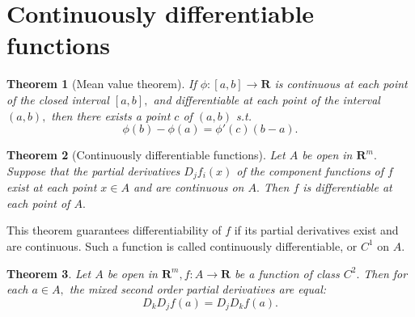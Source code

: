 \documentclass[17pt]{extarticle}
\theoremstyle{plain}
\newtheorem{theorem}{Theorem}
\theoremstyle{definition}
\theoremstyle{remark}
\newcommand{\bR}{\mathbf R}
\begin{document}
\section{Continuously differentiable functions}

\begin{theorem}[Mean value theorem]
If $ \phi: [a, b] \longrightarrow \bR $ is continuous at each point of the closed interval $ [a, b], $ and differentiable at each point of the interval $ (a, b), $ then there exists a point $ c $ of $ (a, b) $ s.t. $$
  \phi(b) - \phi(a) = \phi'(c) (b - a).
$$
\end{theorem}

\begin{theorem}[Continuously differentiable functions]
  Let $ A $ be open in $ \bR^m. $ Suppose that the partial derivatives $ D_j f_i(x) $ of the component functions of $ f $ exist at each point $ x \in A $ and are continuous on $ A. $ Then $ f $ is differentiable at each point of $ A. $
\end{theorem}

This theorem guarantees differentiability of $ f $ if its partial derivatives exist and are continuous. Such a function is called continuously differentiable, or $ C^1 $ on $ A. $

\begin{theorem}
  Let $ A $ be open in $ \bR^m, f: A \longrightarrow \bR $ be a function of class $ C^2. $ Then for each $ a \in A, $ the mixed second order partial derivatives are equal: $$
    D_k D_j f(a) = D_j D_k f(a).
  $$
\end{theorem}
\end{document}
